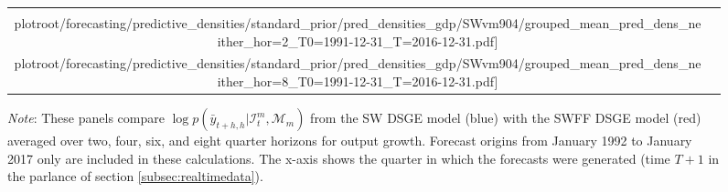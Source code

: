 \documentclass[12pt]{article}
\theoremstyle{definition}
\newcommand\plotroot{../figures_for_paper}
\begin{document}
\begin{figure}[h!]
\begin{center}
\begin{tabular}{@{\hspace*{-.4cm}}cc}
            \texttt{[image: \\plotroot/forecasting/predictive\_densities/standard\_prior/pred\_densities\_gdp/SWvm904/grouped\_mean\_pred\_dens\_neither\_hor=2\_T0=1991-12-31\_T=2016-12-31.pdf]} &
            \texttt{[image: \\plotroot/forecasting/predictive\_densities/standard\_prior/pred\_densities\_gdp/SWvm904/grouped\_mean\_pred\_dens\_neither\_hor=8\_T0=1991-12-31\_T=2016-12-31.pdf]} \\[-.5ex]
        \end{tabular}
    \end{center}
    \begin{minipage}{\textwidth}
    \vspace{-.5cm}
    \scriptsize
    \setlength{\baselineskip}{2mm}
    \emph{Note}: These panels compare $\log p(\bar{y}_{t+h, h} | \mathcal{I}^m_{t},\mathcal{M}_{m})$ from the SW DSGE model (blue) with the SWFF DSGE model (red) averaged over two, four, six, and eight quarter horizons for output growth. Forecast origins from January 1992 to January 2017 only are included in these calculations. The x-axis shows the quarter in which the forecasts were generated (time $T+1$ in the parlance of section \ref{subsec:realtimedata}).
    \end{minipage}
\end{figure}
\end{document}
